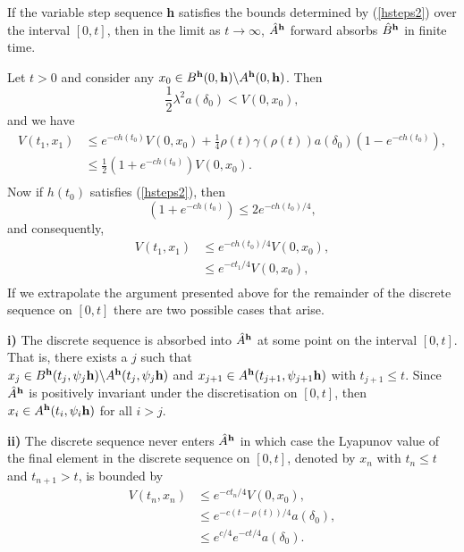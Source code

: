 \begin{lemma}
  If the variable step sequence {\bf h} satisfies the bounds determined by
(\ref{hsteps2}) over the interval $[0,t]$, then in the limit as $t \to
\infty$, $\hat{A}^{{\bf h}}$ forward absorbs $\hat{B}^{{\bf h}}$ in finite time.
\end{lemma}
\begin{prf}
Let $t > 0$ and consider any $x_0 \in B^{{\bf h}}(0,
{\bf h}) \backslash A^{{\bf h}}(0, {\bf h})$. Then
\[ \frac{1}{2} \lambda^2 a(\delta_0) < V( 0, x_0), \]
and we have
\begin{align*}
  V(t_{1}, x_{1}) &\leq e^{-ch(t_0)}V(0, x_0) + \frac{1}{4}\rho(t)
            \gamma(\rho(t))a(\delta_0)(1 - e^{-ch(t_0)}), \\
    &\leq \frac{1}{2}(1 + e^{-ch(t_0)})V(0, x_0). \\
\end{align*}
Now if $h(t_0)$ satisfies (\ref{hsteps2}), then
\[ (1 + e^{-ch(t_0)}) \leq 2 e^{-ch(t_0)/4}, \]
and consequently,
\begin{align*}
  V(t_1, x_1) &\leq e^{-ch(t_0)/4} V(0,x_0), \\
    &\leq e^{-ct_1/4} V(0,x_0), \\
\end{align*}
If we extrapolate the argument presented above for the remainder of the discrete
sequence on $[0, t]$ there are two possible cases that arise.

{\bf i)} The discrete sequence is absorbed into $\hat{A}^{{\bf h}}$ at some
point on the interval $[0,t]$. That is, there exists a $j$ such that \\ $x_{j} \in
B^{{\bf h}}(t_j, \psi_j {\bf h}) \backslash A^{{\bf h}}(t_j, \psi_j {\bf h})$
and $x_{j+1} \in A^{{\bf h}}(t_{j+1}, \psi_{j+1} {\bf h})$ with $t_{j+1} \leq
t$. Since $\hat{A}^{{\bf h}}$ is positively invariant under the discretisation
on $[0,t]$, then $x_i \in A^{{\bf h}}(t_i, \psi_i {\bf h})$ for all $i > j$.

{\bf ii)} The discrete sequence never enters $\hat{A}^{{\bf h}}$ in which case
the Lyapunov value of the final element in the discrete sequence on $[0,t]$,
denoted by $x_n$ with $t_n \leq t$ and $t_{n+1} > t$, is bounded by
\begin{align*}
  V(t_n, x_n) &\leq e^{-ct_n/4} V(0, x_0), \\
    &\leq e^{-c(t- \rho(t))/4} a(\delta_0), \\
    &\leq e^{c/4} e^{-ct/4} a(\delta_0). \\
\end{align*}


\end{prf}
